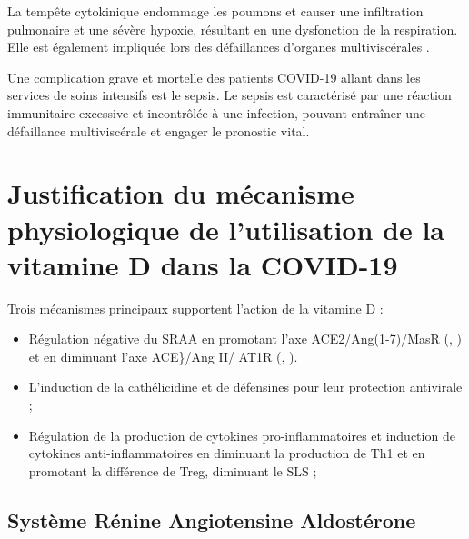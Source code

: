 \documentclass[
  a4paper,
  DIV=11,
  numbers=noendperiod,
  listof=totoc]{scrreprt}
\providecommand{\tightlist}{%
  \setlength{\itemsep}{0pt}\setlength{\parskip}{0pt}}\usepackage{longtable,booktabs,array}
\begin{document}
La tempête cytokinique endommage les poumons et causer une infiltration
pulmonaire et une sévère hypoxie, résultant en une dysfonction de la
respiration. Elle est également impliquée lors des défaillances
d'organes multiviscérales \autocite{Argano.2023}.

Une complication grave et mortelle des patients COVID-19 allant dans les
services de soins intensifs est le sepsis. Le sepsis est caractérisé par
une réaction immunitaire excessive et incontrôlée à une infection,
pouvant entraîner une défaillance multiviscérale et engager le pronostic
vital.

\section{Justification du mécanisme physiologique de l'utilisation de la
vitamine D dans la
COVID-19}\label{justification-du-muxe9canisme-physiologique-de-lutilisation-de-la-vitamine-d-dans-la-covid-19}

Trois mécanismes principaux supportent l'action de la vitamine D
\autocite{Pal.2022,Borsche.2021} :

\begin{itemize}
\tightlist
\item
  Régulation négative du \ac{SRAA} en promotant l'axe ACE2/Ang(1-7)/MasR
  (, ) et en diminuant l'axe ACE\}/Ang II/
  AT1R (, ).
\item
  L'induction de la cathélicidine et de défensines pour leur protection
  antivirale ;
\item
  Régulation de la production de cytokines pro-inflammatoires et
  induction de cytokines anti-inflammatoires en diminuant la production
  de Th1 et en promotant la différence de \ac{Treg}, diminuant le
  \ac{SLS} ;
\end{itemize}

\subsection{Système Rénine Angiotensine
Aldostérone}\label{systuxe8me-ruxe9nine-angiotensine-aldostuxe9rone}
\end{document}
